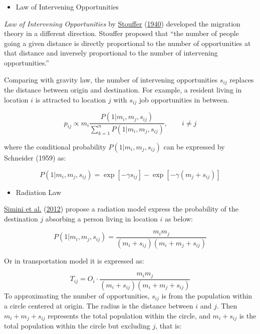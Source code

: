 \documentclass[
  11pt,
  openany]{memoir}
\providecommand{\tightlist}{%
  \setlength{\itemsep}{0pt}\setlength{\parskip}{0pt}}
\begin{document}
\begin{itemize}
\tightlist
\item
  Law of Intervening Opportunities
\end{itemize}

\emph{Law of Intervening Opportunities} by \protect\hyperlink{ref-stoufferInterveningOpportunitiesTheory1940}{Stouffer} (\protect\hyperlink{ref-stoufferInterveningOpportunitiesTheory1940}{1940}) developed the migration theory in a different direction. Stouffer proposed that ``the number of people going a given distance is directly proportional to the number of opportunities at that distance and inversely proportional to the number of intervening opportunities.''

Comparing with gravity law, the number of intervening opportunities \(s_{ij}\) replaces the distance between origin and destination. For example, a resident living in location \(i\) is attracted to location \(j\) with \(s_{ij}\) job opportunities in between.

\[
p_{ij}\propto m_i \frac{P(1|m_i,m_j,s_{ij})}{\sum_{k=1}^n P(1|m_i,m_j,s_{ij})}, \qquad i\ne j 
\]

where the conditional probability \(P(1|m_i,m_j,s_{ij})\) can be expressed by Schneider (1959) as:

\[
P(1|m_i,m_j,s_{ij})=\exp[-\gamma s_{ij}] - \exp[-\gamma (m_j + s_{ij})]
\]

\begin{itemize}
\tightlist
\item
  Radiation Law
\end{itemize}

\protect\hyperlink{ref-siminiUniversalModelMobility2012}{Simini et al.} (\protect\hyperlink{ref-siminiUniversalModelMobility2012}{2012}) propose a radiation model express the probability of the destination \(j\) absorbing a person living in location \(i\) as below:

\[
P(1|m_i,m_j,s_{ij})= \frac{m_i m_j}{(m_i + s_{ij})(m_i + m_j + s_{ij})}
\]

Or in transportation model it is expressed as:

\[
T_{ij}= O_i\cdot\frac{m_i m_j}{(m_i + s_{ij})(m_i + m_j + s_{ij})}
\] To approximating the number of opportunities, \(s_{ij}\) is from the population within a circle centered at origin. The radius is the distance between \(i\) and \(j\). Then \(m_i + m_j + s_{ij}\) represents the total population within the circle, and \(m_i + s_{ij}\) is the total population within the circle but excluding \(j\), that is:
\end{document}
